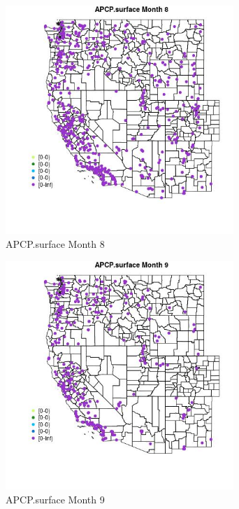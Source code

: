 \begin{figure} 
\centering  
\includegraphics[width=0.77\textwidth]{Code_Outputs/Report_ML_input_PM25_Step4_part_e_de_duplicated_aves_compiled_2019-05-18wNAs_MapObsMo8APCPsurface.jpg} 
\caption{\label{fig:Report_ML_input_PM25_Step4_part_e_de_duplicated_aves_compiled_2019-05-18wNAsMapObsMo8APCPsurface}APCP.surface Month 8} 
\end{figure} 
 

\begin{figure} 
\centering  
\includegraphics[width=0.77\textwidth]{Code_Outputs/Report_ML_input_PM25_Step4_part_e_de_duplicated_aves_compiled_2019-05-18wNAs_MapObsMo9APCPsurface.jpg} 
\caption{\label{fig:Report_ML_input_PM25_Step4_part_e_de_duplicated_aves_compiled_2019-05-18wNAsMapObsMo9APCPsurface}APCP.surface Month 9} 
\end{figure} 
 


